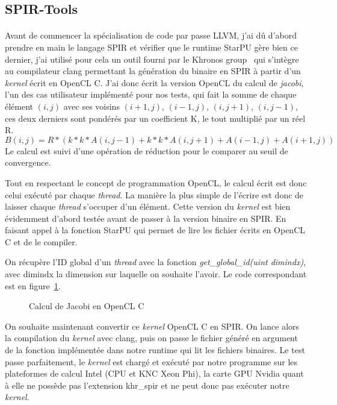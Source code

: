 \subsection{SPIR-Tools}
\paragraph{}
Avant de commencer la spécialisation de code par passe LLVM, j'ai dû d'abord
prendre en main le langage SPIR et vérifier que le runtime StarPU gère bien ce
dernier, j'ai utilisé pour cela un outil fourni par le Khronos
group~\cite{spir_clang} qui s'intègre au compilateur clang permettant la
génération du binaire en SPIR à partir d'un \emph{kernel} écrit en OpenCL C.
J'ai donc écrit la version OpenCL du calcul de \emph{jacobi}, l'un des cas
utilisateur implémenté pour nos tests, qui fait la somme de chaque élément $(i,
j)$ avec ses voisins $(i+1, j)$, $(i-1, j)$, $(i, j+1)$, $(i, j-1)$, ces deux
derniers sont pondérés par un coefficient K, le tout multiplié par un réel R.
\[ B(i, j) = R * ( k*k * A(i, j-1) + k*k * A(i, j+1) + A(i-1, j) + A(i+1, j)) \]
Le calcul est suivi d'une opération de réduction pour le comparer au seuil de
convergence.

Tout en respectant le concept de programmation OpenCL, le calcul écrit est donc
celui exécuté par chaque \emph{thread}. La manière la plus simple de l'écrire
est donc de laisser chaque \emph{thread} s'occuper d'un élément. Cette version
du \emph{kernel} est bien évidemment d'abord testée avant de passer à la version
binaire en SPIR. En faisant appel à la fonction StarPU qui permet de lire les
fichier écrits en OpenCL C et de le compiler.

On récupère l'ID global d'un \emph{thread} avec la fonction
\emph{get\_global\_id(uint dimindx)}, avec dimindx la dimension sur laquelle on
souhaite l'avoir. Le code correspondant est en figure~\ref{jacobi_calc_ocl_kernel}.

\begin{figure}[h]
   
   \caption{Calcul de Jacobi en OpenCL C}
   \label{jacobi_calc_ocl_kernel}
\end{figure}

On souhaite maintenant convertir ce \emph{kernel} OpenCL C en SPIR. On lance
alors la compilation du \emph{kernel} avec clang, puis on passe le fichier
généré en argument de la fonction implémentée dans notre runtime qui lit les
fichiers binaires. Le test passe parfaitement, le \emph{kernel} est chargé et
exécuté par notre programme sur les plateformes de calcul Intel (CPU et KNC Xeon
Phi), la carte GPU Nvidia quant à elle ne possède pas l'extension khr\_spir et
ne peut donc pas exécuter notre \emph{kernel}.

